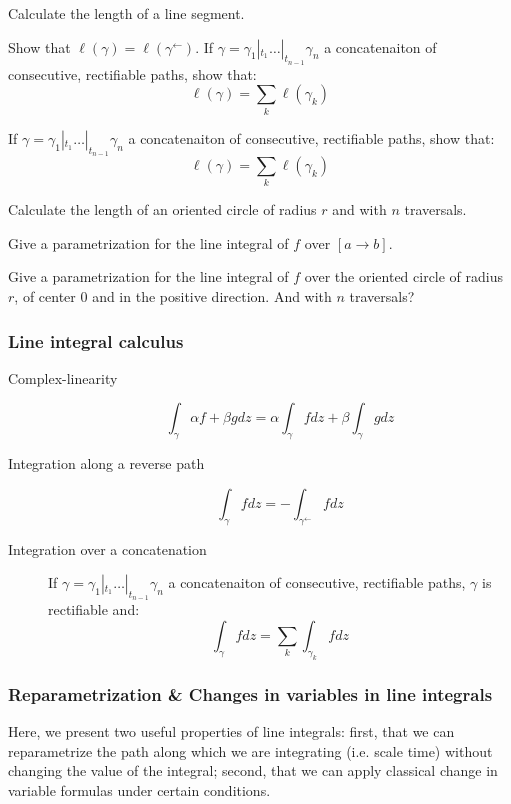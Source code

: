 \begin{exo}[$\star$]
    Calculate the length of a line segment. 
\end{exo}
\begin{exo}[$\star$]
    Show that $\ell(\gamma) = \ell(\gamma^{\leftarrow})$.
    If $\gamma = \gamma_1 |_{t_1} \dots |_{t_{n-1}} \gamma_n$ a concatenaiton of consecutive, rectifiable paths, show that:
    $$ \ell(\gamma) = \sum_k{\ell(\gamma_k)}$$
\end{exo}
\begin{exo}[$\star$]
    If $\gamma = \gamma_1 |_{t_1} \dots |_{t_{n-1}} \gamma_n$ a concatenaiton of consecutive, rectifiable paths, show that:
    $$ \ell(\gamma) = \sum_k{\ell(\gamma_k)}$$
\end{exo}
\begin{exo}[$\star$]
    Calculate the length of an oriented circle of radius $r$ and with $n$ traversals.
\end{exo}
\begin{exo}
    Give a parametrization for the line integral of $f$ over $[a \rightarrow b]$.
\end{exo}
\begin{exo}
    Give a parametrization for the line integral of $f$ over the oriented circle of radius $r$, of center $0$ and in the positive direction. And with $n$ traversals?
\end{exo}


\subsubsection{Line integral calculus}
\begin{description}
    \item[Complex-linearity] $$\int_\gamma \alpha f + \beta g dz = \alpha \int_\gamma fdz + \beta \int_\gamma gdz$$
    \item[Integration along a reverse path] $$\int_\gamma fdz = - \int_{\gamma^{\leftarrow}}fdz$$
    \item[Integration over a concatenation] If $\gamma = \gamma_1 |_{t_1} \dots |_{t_{n-1}} \gamma_n$ a concatenaiton of consecutive, rectifiable paths, $\gamma$ is rectifiable and:
        $$\int_\gamma fdz = \sum_k \int_{\gamma_k}fdz$$
\end{description}

\subsubsection{Reparametrization \& Changes in variables in line integrals}
Here, we present two useful properties of line integrals: first, that we can reparametrize the path along which we are integrating (i.e. scale time) without changing the value of the integral; second, that we can apply classical change in variable formulas under certain conditions.

